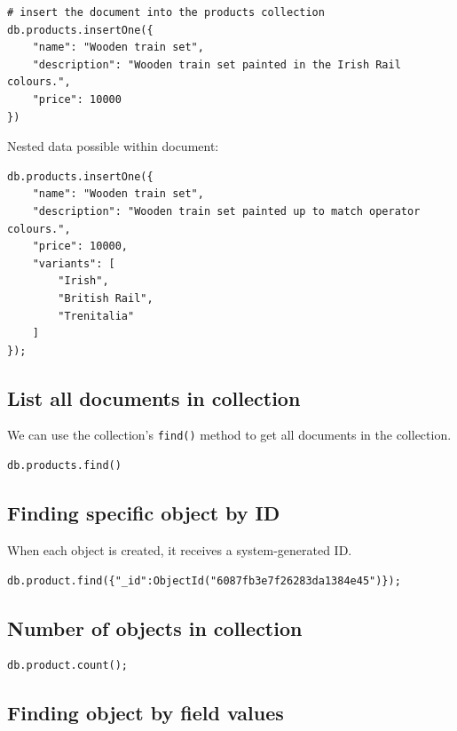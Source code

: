 \documentclass[slides]{pgnotes}
\begin{document}
\begin{verbatim}
# insert the document into the products collection
db.products.insertOne({
    "name": "Wooden train set",
    "description": "Wooden train set painted in the Irish Rail colours.",
    "price": 10000
})
\end{verbatim}

Nested data possible within document:

\begin{verbatim}
db.products.insertOne({
    "name": "Wooden train set",
    "description": "Wooden train set painted up to match operator colours.",
    "price": 10000,
    "variants": [
        "Irish",
        "British Rail",
        "Trenitalia"
    ]
});

\end{verbatim}

\subsection{List all documents in collection}

We can use the collection's \texttt{find()} method to get all documents in the collection.
\begin{verbatim}
db.products.find()
\end{verbatim}

\subsection{Finding specific object by ID}

When each object is created, it receives a system-generated ID.
\begin{verbatim}
db.product.find({"_id":ObjectId("6087fb3e7f26283da1384e45")});
\end{verbatim}

\subsection{Number of objects in collection}

\begin{verbatim}
db.product.count();
\end{verbatim}

\subsection{Finding object by field values}
\end{document}

